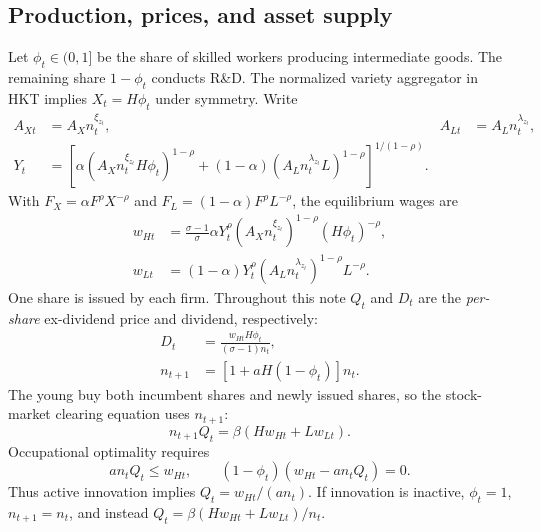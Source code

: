 \documentclass[11pt,a4paper]{article}
\begin{document}
\subsection{Production, prices, and asset supply}
Let $\phi_t\in(0,1]$ be the share of skilled workers producing intermediate
goods. The remaining share $1-\phi_t$ conducts R\&D. The normalized variety
aggregator in HKT implies $X_t=H\phi_t$ under symmetry. Write
\begin{align}
A_{Xt}&=A_X n_t^{\xi_{z_t}}, & A_{Lt}&=A_L n_t^{\lambda_{z_t}},\label{eq:productivities}\\
Y_t&=\left[\alpha(A_Xn_t^{\xi_{z_t}}H\phi_t)^{1-\rho}
 +(1-\alpha)(A_Ln_t^{\lambda_{z_t}}L)^{1-\rho}\right]^{1/(1-\rho)}.
\label{eq:output}
\end{align}
With $F_X=\alpha F^\rho X^{-\rho}$ and
$F_L=(1-\alpha)F^\rho L^{-\rho}$, the equilibrium wages are
\begin{align}
w_{Ht}&=\frac{\sigma-1}{\sigma}\alpha Y_t^\rho
             (A_Xn_t^{\xi_{z_t}})^{1-\rho}(H\phi_t)^{-\rho},\label{eq:wH}\\
w_{Lt}&=(1-\alpha)Y_t^\rho
             (A_Ln_t^{\lambda_{z_t}})^{1-\rho}L^{-\rho}.\label{eq:wL}
\end{align}
One share is issued by each firm. Throughout this note $Q_t$ and $D_t$ are
the \emph{per-share} ex-dividend price and dividend, respectively:
\begin{align}
D_t&=\frac{w_{Ht}H\phi_t}{(\sigma-1)n_t},\label{eq:dividend}\\
n_{t+1}&=[1+aH(1-\phi_t)]n_t.\label{eq:knowledge}
\end{align}
The young buy both incumbent shares and newly issued shares, so the stock-market
clearing equation uses $n_{t+1}$:
\begin{equation}
n_{t+1}Q_t=\beta(Hw_{Ht}+Lw_{Lt}).\label{eq:stockclear}
\end{equation}
Occupational optimality requires
\begin{equation}
an_tQ_t\leq w_{Ht},\qquad
(1-\phi_t)(w_{Ht}-an_tQ_t)=0.\label{eq:occupation}
\end{equation}
Thus active innovation implies $Q_t=w_{Ht}/(an_t)$. If innovation is inactive,
$\phi_t=1$, $n_{t+1}=n_t$, and instead
$Q_t=\beta(Hw_{Ht}+Lw_{Lt})/n_t$.
\end{document}
